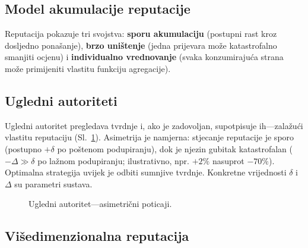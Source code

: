 \documentclass[11pt,a4paper,twocolumn]{article}
\begin{document}
\subsection{Model akumulacije reputacije}

Reputacija pokazuje tri svojstva: \textbf{sporu akumulaciju} (postupni rast kroz dosljedno ponašanje), \textbf{brzo uništenje} (jedna prijevara može katastrofalno smanjiti ocjenu) i \textbf{individualno vrednovanje} (svaka konzumirajuća strana može primijeniti vlastitu funkciju agregacije).

\subsection{Ugledni autoriteti}

Ugledni autoritet pregledava tvrdnje i, ako je zadovoljan, supotpisuje ih---zalažući vlastitu reputaciju (Sl.~\ref{fig:authority}). Asimetrija je namjerna: stjecanje reputacije je sporo (postupno $+\delta$ po poštenom podupiranju), dok je njezin gubitak katastrofalan ($-\Delta \gg \delta$ po lažnom podupiranju; ilustrativno, npr. $+2\%$ nasuprot $-70\%$). Optimalna strategija uvijek je odbiti sumnjive tvrdnje. Konkretne vrijednosti $\delta$ i $\Delta$ su parametri sustava.

\begin{figure}[ht]
\centering
{}
\caption{Ugledni autoritet---asimetrični poticaji.}
\label{fig:authority}
\end{figure}

\subsection{Višedimenzionalna reputacija}
\end{document}
